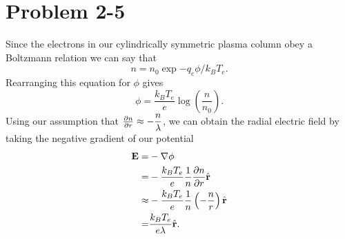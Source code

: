 \section*{Problem 2-5}
\label{sec:2-5}
Since the electrons in our cylindrically symmetric plasma column obey a Boltzmann relation we can say that
\begin{equation}
	n = n_0\exp{-q_e\phi/k_BT_e}.
\end{equation}
Rearranging this equation for \(\phi \) gives
\begin{equation}
	\phi = \dfrac{k_BT_e}{e}\log(\dfrac{n}{n_0}).
\end{equation}
Using our assumption that \(\frac{\partial n}{\partial r} \approx -\dfrac{n}{\lambda} \), we can obtain the radial electric field by taking the negative gradient of our potential
\begin{align}
	\textbf{E} =& -\nabla \phi\\
	=& -\dfrac{k_BT_e}{e}\dfrac{1}{n}\frac{\partial n}{\partial r}\hat{\textbf{r}} \\
	\approx& -\dfrac{k_BT_e}{e}\dfrac{1}{n}\left(-\dfrac{n}{r}\right)\hat{\textbf{r}} \\
	=& \dfrac{k_BT_e}{e\lambda}\hat{\textbf{r}}.
\end{align}

